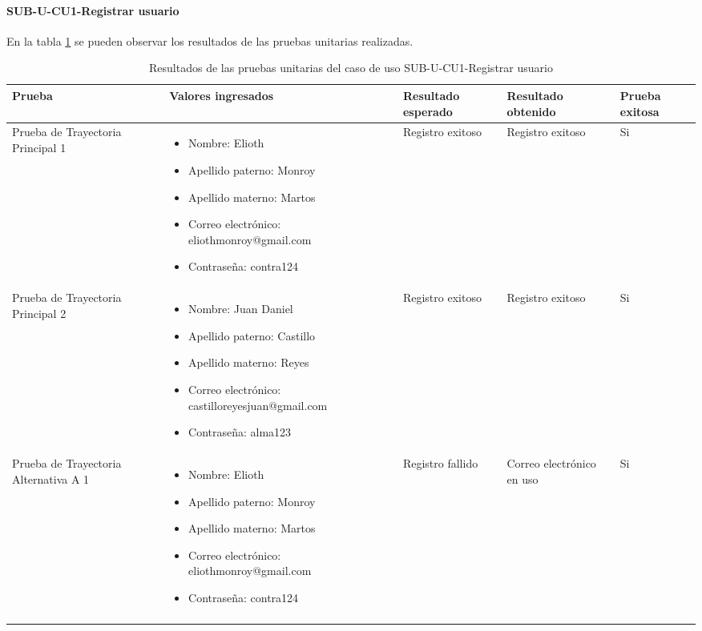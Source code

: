 \paragraph{SUB-U-CU1-Registrar usuario}\label{SUB-U-CU1:Pruebas}
En la tabla \ref{pruebas_unitarias_sub-u-cu1} se pueden observar los resultados de las pruebas unitarias realizadas.
\begin{longtable}{|M{2cm}| M{4.5cm}|M{3cm}|M{3cm}|M{1.5cm}|}
	\hline
	\textbf{Prueba} & \textbf{Valores ingresados} & \textbf{Resultado esperado} & \textbf{Resultado obtenido} & \textbf{Prueba exitosa} \\ \hline
	Prueba de Trayectoria Principal 1& 
	\begin{itemize}
		\item Nombre: Elioth
		\item Apellido paterno: Monroy
		\item Apellido materno: Martos
		\item Correo electrónico: eliothmonroy@gmail.com
		\item Contraseña: contra124
	\end{itemize}
	& Registro exitoso
	& Registro exitoso & Si \\ \hline

	Prueba de Trayectoria Principal 2& 
	\begin{itemize}
		\item Nombre: Juan Daniel
		\item Apellido paterno: Castillo
		\item Apellido materno: Reyes
		\item Correo electrónico: castilloreyesjuan@gmail.com
		\item Contraseña: alma123
	\end{itemize}
	& Registro exitoso
	& Registro exitoso & Si \\ \hline

	Prueba de Trayectoria Alternativa A 1& 
	\begin{itemize}
		\item Nombre: Elioth
		\item Apellido paterno: Monroy
		\item Apellido materno: Martos
		\item Correo electrónico: eliothmonroy@gmail.com
		\item Contraseña: contra124
	\end{itemize}
	& Registro fallido
	& Correo electrónico en uso & Si \\ \hline
	\caption{Resultados de las pruebas unitarias del caso de uso SUB-U-CU1-Registrar usuario}
	\label{pruebas_unitarias_sub-u-cu1}
\end{longtable}
